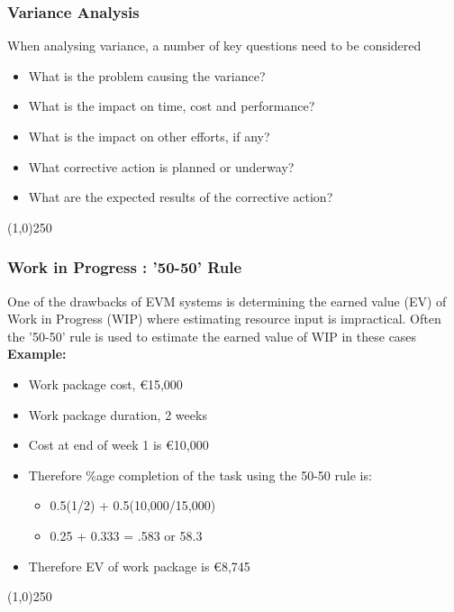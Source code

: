 \begin{frame}
\frametitle{Variance Analysis}
When analysing variance, a number of key questions need to be considered
\begin{itemize}
	\item What is the problem causing the variance?
	\item What is the impact on time, cost and performance?
	\item What is the impact on other efforts, if any?
	\item What corrective action is planned or underway?
	\item What are the expected results of the corrective action?
\end{itemize}
\end{frame}
\begin{center}\line(1,0){250}\end{center}







\begin{frame}
\frametitle{Work in Progress : '50-50' Rule}
One of the drawbacks of EVM systems is  determining the earned value (EV) of Work in Progress (WIP) where estimating resource input is impractical.  Often the '50-50' rule is used to estimate the earned value of WIP in these cases\\
\textbf{Example:}
\begin{itemize}
	\item Work package cost, \euro15,000
	\item Work package duration, 2 weeks
	\item Cost at end of week 1 is \euro10,000
	\item Therefore \%age completion of the task using the 50-50 rule is:
	\begin{itemize}
		\item 0.5(1/2) + 0.5(10,000/15,000)
		\item	0.25 + 0.333 = .583 or 58.3%
	\end{itemize}
	\item Therefore EV of work package is \euro8,745
\end{itemize}
\end{frame}
\begin{center}\line(1,0){250}\end{center}






